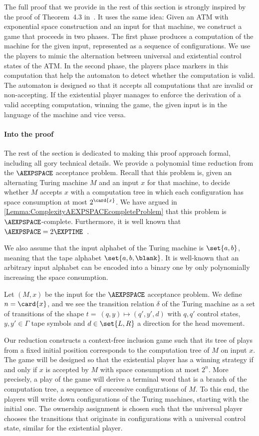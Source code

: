 \documentclass[../../diss.tex]{subfiles}
\begin{document}
The full proof that we provide in the rest of this section is strongly inspired by the proof of Theorem~4.3 in~\cite{MuschollSS06}.
It uses the same idea:
Given an ATM with exponential space construction and an input for that machine, we construct a game that proceeds in two phases.
The first phase produces a computation of the machine for the given input, represented as a sequence of configurations.
We use the players to mimic the alternation between universal and existential control states of the ATM.\@
In the second phase, the players place markers in this computation that help the automaton to detect whether the computation is valid.
The automaton is designed so that it accepts all computations that are invalid or non-accepting.
If the existential player manages to enforce the derivation of a valid accepting computation, winning the game, the given input is in the language of the machine and vice versa.

\paragraph{Into the proof}

The rest of the section is dedicated to making this proof approach formal, including all gory technical details.
We provide a polynomial time reduction from the $\AEXPSPACE$ acceptance problem.
Recall that this problem is, given an alternating Turing machine $M$ and an input $x$ for that machine, to decide whether $M$ accepts $x$ with a computation tree in which each configuration has space consumption at most $2^{\card{x}}$.
We have argued in \cref{Lemma:ComplexityAEXPSPACEcompleteProblem} that this problem is $\AEXPSPACE$-complete.
Furthermore, it is well known that $\AEXPSPACE = 2\EXPTIME$~\cite{ChandraKS81}.

We also assume that the input alphabet of the Turing machine is $\set{a,b}$, meaning that the tape alphabet $\set{a,b,\blank}$.
It is well-known that an arbitrary input alphabet can be encoded into a binary one by only polynomially increasing the space consumption.

Let $(M,x)$ be the input for the $\AEXPSPACE$ acceptance problem.
We define $n = \card{x}$, and we see the transition relation $\delta$ of the Turing machine as a set of transitions of the shape $t = \  (q,y) \mapsto (q',y',d)$ with $q,q'$ control states, $y,y' \in \Gamma$ tape symbols and $d \in \set{L,R}$ a direction for the head movement.

Our reduction constructs a context-free inclusion game such that its tree of plays from a fixed initial position corresponds to the computation tree of $M$ on input $x$.
The game will be designed so that the existential player has a winning strategy if and only if $x$ is accepted by $M$ with space consumption at most $2^n$.
More precisely, a play of the game will derive a terminal word that is a branch of the computation tree, \ie a sequence of successive configurations of $M$.
To this end, the players will write down configurations of the Turing machines, starting with the initial one.
The ownership assignment is chosen such that the universal player chooses the transitions that originate in configurations with a universal control state, similar for the existential player.
\end{document}
